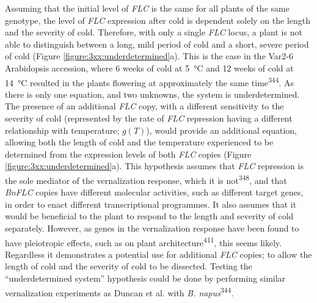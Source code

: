 \documentclass[12pt,]{book}
\begin{document}
Assuming that the initial level of \emph{FLC} is the same for all plants
of the same genotype, the level of \emph{FLC} expression after cold is
dependent solely on the length and the severity of cold. Therefore, with
only a single \emph{FLC} locus, a plant is not able to distinguish
between a long, mild period of cold and a short, severe period of cold
(Figure \ref{figure:3xx:underdetermined}a). This is the case in the
Var2-6 Arabidopsis accession, where 6 weeks of cold at 5~°C and 12 weeks
of cold at 14~°C resulted in the plants flowering at approximately the
same time\textsuperscript{344}. As there is only one equation, and two
unknowns, the system is underdetermined. The presence of an additional
\emph{FLC} copy, with a different sensitivity to the severity of cold
(represented by the rate of \emph{FLC} repression having a different
relationship with temperature; \(g(T)\)), would provide an additional
equation, allowing both the length of cold and the temperature
experienced to be determined from the expression levels of both
\emph{FLC} copies (Figure \ref{figure:3xx:underdetermined}a). This
hypothesis assumes that \emph{FLC} repression is the sole mediator of
the vernalization response, which it is not\textsuperscript{348}, and
that \emph{BnFLC} copies have different molecular activities, such as
different target genes, in order to enact different transcriptional
programmes. It also assumes that it would be beneficial to the plant to
respond to the length and severity of cold separately. However, as genes
in the vernalization response have been found to have pleiotropic
effects, such as on plant architecture\textsuperscript{411}, this seems
likely. Regardless it demonstrates a potential use for additional
\emph{FLC} copies; to allow the length of cold and the severity of cold
to be dissected. Testing the ``underdetermined system'' hypothesis could
be done by performing similar vernalization experiments as Duncan et al.
with \emph{B. napus}\textsuperscript{344}.
\end{document}
